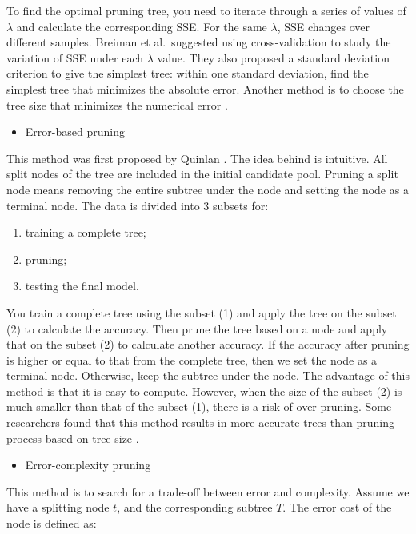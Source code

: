 \documentclass[
  12pt,
]{krantz}
\providecommand{\tightlist}{%
  \setlength{\itemsep}{0pt}\setlength{\parskip}{0pt}}
\begin{document}
To find the optimal pruning tree, you need to iterate through a series of values of \(\lambda\) and calculate the corresponding SSE. For the same \(\lambda\), SSE changes over different samples. Breiman et al.~suggested using cross-validation \citep{Breiman1984} to study the variation of SSE under each \(\lambda\) value. They also proposed a standard deviation criterion to give the simplest tree: within one standard deviation, find the simplest tree that minimizes the absolute error. Another method is to choose the tree size that minimizes the numerical error \citep{Hastie2008}.

\begin{itemize}
\tightlist
\item
  Error-based pruning
\end{itemize}

This method was first proposed by Quinlan \citep{Quinlan1999}. The idea behind is intuitive. All split nodes of the tree are included in the initial candidate pool. Pruning a split node means removing the entire subtree under the node and setting the node as a terminal node. The data is divided into 3 subsets for:

\begin{enumerate}
\def\labelenumi{(\arabic{enumi})}
\item
  training a complete tree;
\item
  pruning;
\item
  testing the final model.
\end{enumerate}

You train a complete tree using the subset (1) and apply the tree on the subset (2) to calculate the accuracy. Then prune the tree based on a node and apply that on the subset (2) to calculate another accuracy. If the accuracy after pruning is higher or equal to that from the complete tree, then we set the node as a terminal node. Otherwise, keep the subtree under the node. The advantage of this method is that it is easy to compute. However, when the size of the subset (2) is much smaller than that of the subset (1), there is a risk of over-pruning. Some researchers found that this method results in more accurate trees than pruning process based on tree size \citep{Espoito1997}.

\begin{itemize}
\tightlist
\item
  Error-complexity pruning
\end{itemize}

This method is to search for a trade-off between error and complexity. Assume we have a splitting node \(t\), and the corresponding subtree \(T\). The error cost of the node is defined as:
\end{document}
